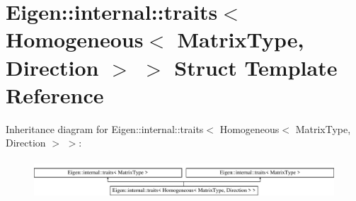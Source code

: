 \hypertarget{struct_eigen_1_1internal_1_1traits_3_01_homogeneous_3_01_matrix_type_00_01_direction_01_4_01_4}{}\section{Eigen\+:\+:internal\+:\+:traits$<$ Homogeneous$<$ Matrix\+Type, Direction $>$ $>$ Struct Template Reference}
\label{struct_eigen_1_1internal_1_1traits_3_01_homogeneous_3_01_matrix_type_00_01_direction_01_4_01_4}
Inheritance diagram for Eigen\+:\+:internal\+:\+:traits$<$ Homogeneous$<$ Matrix\+Type, Direction $>$ $>$\+:\begin{figure}[H]
\begin{center}
\leavevmode
\includegraphics[height=1.458333cm]{struct_eigen_1_1internal_1_1traits_3_01_homogeneous_3_01_matrix_type_00_01_direction_01_4_01_4}
\end{center}
\end{figure}
